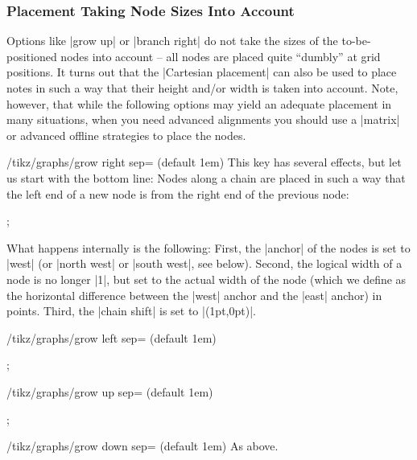 \subsubsection{Placement Taking Node Sizes Into Account}

Options like |grow up| or |branch right| do not take the sizes of the
to-be-positioned nodes into account -- all nodes are placed quite
``dumbly'' at grid positions. It turns out that the
|Cartesian placement| can also be used to place notes in such a way
that their height and/or width is taken into account. Note, however,
that while the following options may yield an adequate placement in
many situations, when you need advanced alignments you should use a
|matrix| or advanced offline strategies to place the nodes.


\begin{key}{/tikz/graphs/grow right sep= (default 1em)}
  This key has several effects, but let us start with the bottom line:
  Nodes along a chain are placed in such a way that the left end of a
  new node is  from the right end of the previous node: 
\begin{codeexample}[]
\tikz {};      
\end{codeexample}
  What happens internally is the following: First, the |anchor| of the
  nodes is set to |west| (or |north west| or |south west|, see
  below). Second, the logical width of a node is no 
  longer |1|, but set to the actual width of the node (which we define
  as the horizontal difference between the |west| anchor and the
  |east| anchor) in points. Third, the |chain shift| is set to
  |(1pt,0pt)|.
\end{key}
\begin{key}{/tikz/graphs/grow left sep= (default 1em)}
\begin{codeexample}[]
\tikz {};      
\end{codeexample}
\end{key}
\begin{key}{/tikz/graphs/grow up sep= (default 1em)}
\begin{codeexample}[]
\tikz {};      
\end{codeexample}
\end{key}
\begin{key}{/tikz/graphs/grow down sep= (default 1em)}
  As above.
\end{key}

